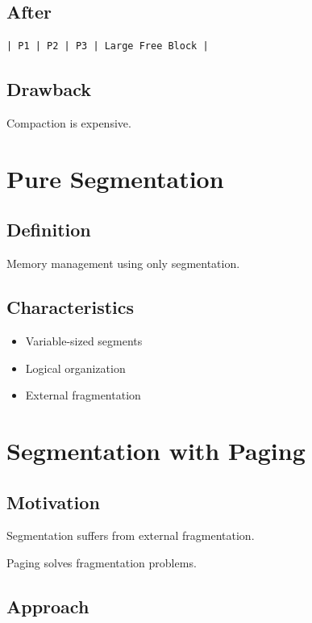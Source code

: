 \subsection{After}

\begin{verbatim}
| P1 | P2 | P3 | Large Free Block |
\end{verbatim}

\subsection{Drawback}

Compaction is expensive.

\section{Pure Segmentation}

\subsection{Definition}

Memory management using only segmentation.

\subsection{Characteristics}

\begin{itemize}
\item Variable-sized segments
\item Logical organization
\item External fragmentation
\end{itemize}

\section{Segmentation with Paging}

\subsection{Motivation}

Segmentation suffers from external fragmentation.

Paging solves fragmentation problems.

\subsection{Approach}

